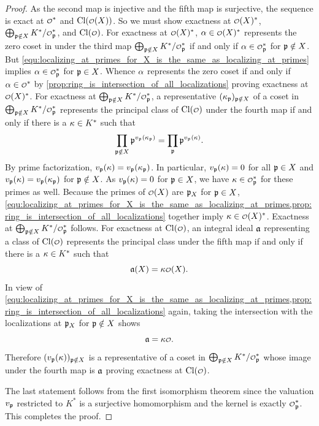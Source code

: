     \begin{proof}
      As the second map is injective and the fifth map is surjective, the sequence is exact at \(\smc{O}^{\ast}\) and \(\Cl(\smc{O}(X))\). So we must show exactness at \(\smc{O}(X)^{\ast}\), \(\bigop_{\mf{p} \notin X}K^{\ast}/\smc{O}_{\mf{p}}^{\ast}\), and \(\Cl(\smc{O})\). For exactness at \(\smc{O}(X)^{\ast}\), \(\a \in \smc{O}(X)^{\ast}\) represents the zero coset in under the third map \(\bigop_{\mf{p} \notin X}K^{\ast}/\smc{O}_{\mf{p}}^{\ast}\) if and only if \(\a \in \smc{O}_{\mf{p}}^{\ast}\) for \(\mathfrak{p} \notin X\). But \cref{equ:localizing_at_primes_for_X_is_the_same_as_localizing_at_primes} implies \(\a \in \smc{O}_{\mf{p}}^{\ast}\) for \(\mathfrak{p} \in X\). Whence \(\alpha\) represents the zero coset if and only if \(\a \in \smc{O}^{\ast}\) by \cref{prop:ring_is_intersection_of_all_localizations} proving exactness at \(\smc{O}(X)^{\ast}\). For exactness at \(\bigop_{\mf{p} \notin X}K^{\ast}/\smc{O}_{\mf{p}}^{\ast}\), a representative \((\kappa_{\mathfrak{p}})_{\mathfrak{p} \notin X}\) of a coset in \(\bigop_{\mf{p} \notin X}K^{\ast}/\smc{O}_{\mf{p}}^{\ast}\) represents the principal class of \(\Cl(\smc{O})\) under the fourth map if and only if there is a \(\kappa \in K^{\ast}\) such that
      \[
        \prod_{\mathfrak{p} \notin X}\mathfrak{p}^{v_{\mathfrak{p}}(\kappa_{\mathfrak{p}})} = \prod_{\mathfrak{p}}\mathfrak{p}^{v_{\mathfrak{p}}(\kappa)}.
      \]
      By prime factorization, \(v_{\mathfrak{p}}(\kappa) = v_{\mathfrak{p}}(\kappa_{\mathfrak{p}})\). In particular, \(v_{\mathfrak{p}}(\kappa) = 0\) for all \(\mathfrak{p} \in X\) and \(v_{\mathfrak{p}}(\kappa) = v_{\mathfrak{p}}(\kappa_{\mathfrak{p}})\) for \(\mathfrak{p} \notin X\). As \(v_{\mathfrak{p}}(\kappa) = 0\) for \(\mathfrak{p} \in X\), we have \(\k \in \smc{O}_{\mf{p}}^{\ast}\) for these primes as well. Because the primes of \(\smc{O}(X)\) are \(\mathfrak{p}_{X}\) for \(\mathfrak{p} \in X\), \cref{equ:localizing_at_primes_for_X_is_the_same_as_localizing_at_primes,prop:ring_is_intersection_of_all_localizations} together imply \(\k \in \smc{O}(X)^{\ast}\). Exactness at \(\bigop_{\mf{p} \notin X}K^{\ast}/\smc{O}_{\mf{p}}^{\ast}\) follows. For exactness at \(\Cl(\smc{O})\), an integral ideal \(\mathfrak{a}\) representing a class of \(\Cl(\smc{O})\) represents the principal class under the fifth map if and only if there is a \(\kappa \in K^{\ast}\) such that
      \[
        \mf{a}(X) = \k\smc{O}(X).
      \]
      In view of \cref{equ:localizing_at_primes_for_X_is_the_same_as_localizing_at_primes,prop:ring_is_intersection_of_all_localizations} again, taking the intersection with the localizations at \(\mathfrak{p}_{X}\) for \(\mathfrak{p} \notin X\) shows
      \[
        \mf{a} = \k\smc{O}.
      \]
      Therefore \((v_{\mathfrak{p}}(\kappa))_{\mathfrak{p} \notin X}\) is a representative of a coset in \(\bigop_{\mf{p} \notin X}K^{\ast}/\smc{O}_{\mf{p}}^{\ast}\) whose image under the fourth map is \(\mathfrak{a}\) proving exactness at \(\Cl(\smc{O})\). 
      
      The last statement follows from the first isomorphism theorem since the valuation \(v_{\mathfrak{p}}\) restricted to \(K^{\ast}\) is a surjective homomorphism and the kernel is exactly \(\smc{O}_{\mf{p}}^{\ast}\). This completes the proof.
    \end{proof}

